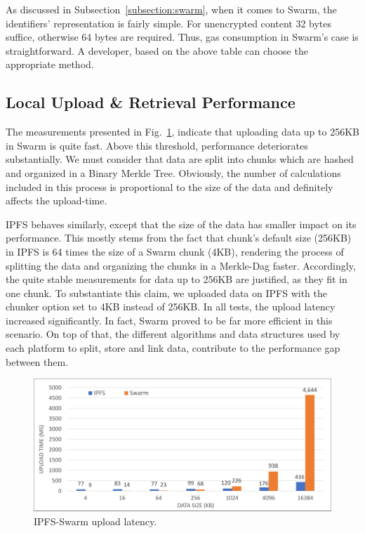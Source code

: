 As discussed in Subsection~\ref{subsection:swarm}, when it comes to Swarm, the identifiers’ representation is fairly simple. For unencrypted content 32 bytes suffice, otherwise 64 bytes are required. Thus, gas consumption in Swarm’s case is straightforward. A developer, based on the above table can choose the appropriate method.
\subsection{Local Upload \& Retrieval Performance}\label{subsection:evaluation_local}
The measurements presented in Fig.~\ref{fig: ipfs_swarm_upload}, indicate that uploading data up to 256KB in Swarm is quite fast. Above this threshold, performance deteriorates substantially. We must consider that data are split into chunks which are hashed and organized in a Binary Merkle Tree. Obviously, the number of calculations included in this process is proportional to the size of the data and definitely affects the upload-time.

IPFS behaves similarly, except that the size of the data has smaller impact on its performance. This mostly stems from the fact that chunk’s default size (256KB) in IPFS is 64 times the size of a Swarm chunk (4KB), rendering the process of splitting the data and organizing the chunks in a Merkle-Dag faster. Accordingly, the quite stable measurements for data up to 256KB are justified, as they fit in one chunk. To substantiate this claim, we uploaded data on IPFS with the chunker option set to 4KB instead of 256KB. In all tests, the upload latency increased significantly. In fact, Swarm proved to be far more efficient in this scenario. On top of that, the different algorithms and data structures used by each platform to split, store and link data, contribute to the performance gap between them.

\begin{figure}[htbp]
\centerline{\includegraphics[width=\textwidth]{figs/ipfs_swarm_upload.pdf}}
\caption{IPFS-Swarm upload latency.}
\label{fig: ipfs_swarm_upload}
\end{figure}
\setlength{\belowcaptionskip}{-10pt}

